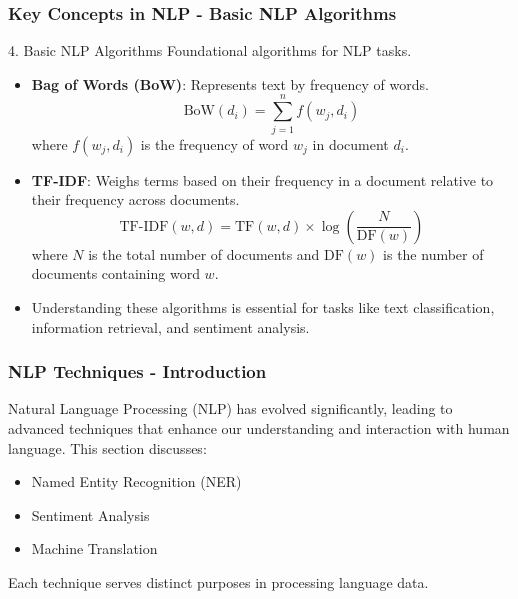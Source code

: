 \documentclass[aspectratio=169]{beamer}
\begin{document}
\begin{frame}[fragile]
    \frametitle{Key Concepts in NLP - Basic NLP Algorithms}
    \begin{block}{4. Basic NLP Algorithms}
        Foundational algorithms for NLP tasks.
    \end{block}

    \begin{itemize}
        \item \textbf{Bag of Words (BoW)}: Represents text by frequency of words.
        \begin{equation}
            \text{BoW}(d_i) = \sum_{j=1}^{n} f(w_j, d_i)
        \end{equation}
        where \(f(w_j, d_i)\) is the frequency of word \(w_j\) in document \(d_i\).

        \item \textbf{TF-IDF}: Weighs terms based on their frequency in a document relative to their frequency across documents.
        \begin{equation}
            \text{TF-IDF}(w, d) = \text{TF}(w, d) \times \log\left(\frac{N}{\text{DF}(w)}\right)
        \end{equation}
        where \(N\) is the total number of documents and \(\text{DF}(w)\) is the number of documents containing word \(w\).
    \end{itemize}

    \begin{itemize}
        \item Understanding these algorithms is essential for tasks like text classification, information retrieval, and sentiment analysis.
    \end{itemize}
\end{frame}

\begin{frame}[fragile]
    \frametitle{NLP Techniques - Introduction}
    Natural Language Processing (NLP) has evolved significantly, leading to advanced techniques that enhance our understanding and interaction with human language. This section discusses:
    \begin{itemize}
        \item Named Entity Recognition (NER)
        \item Sentiment Analysis
        \item Machine Translation
    \end{itemize}
    Each technique serves distinct purposes in processing language data.
\end{frame}
\end{document}
